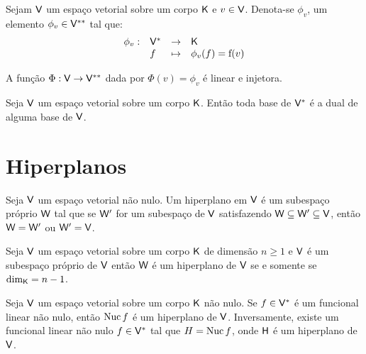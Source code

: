 \documentclass[10pt,a4paper]{book}
\begin{document}
\begin{remark}
	Sejam $\mathsf{ V }$ um espaço vetorial sobre um corpo $\mathsf{ K }$ e $v \in \mathsf{ V }$.	
	Denota-se $\phi_v$, um elemento $\phi_v \in \mathsf{ V } ^ {**}$ tal que: 
	\[
		\begin{array}{llll}
			\phi_v: & \mathsf{ V } ^ * &\rightarrow & \mathsf{ K }             \\
			        & f       &\mapsto     & \phi_v(f) = \mathrm{ f }(v)
		\end{array}
	\]
\end{remark}

\begin{lemma}
	A função $\Phi : \mathsf{ V } \rightarrow \mathsf{ V }^{**}$ dada por $\Phi(v) = \phi_v$ é linear e injetora.
\end{lemma}

\begin{corollary}
	Seja $\mathsf{ V }$ um espaço vetorial sobre um corpo $\mathsf{ K }$. Então toda base de $\mathsf{ V } ^ *$ é a dual de alguma base de $\mathsf{ V }$.
\end{corollary}




\section{Hiperplanos}

\begin{definition}[Hiperplano]
	Seja $\mathsf{ V }$ um espaço vetorial não nulo. Um hiperplano em $\mathsf{ V }$ é um subespaço próprio $\mathsf{ W }$ tal que se $\mathsf{ W }'$ for um subespaço de $\mathsf{ V }$ satisfazendo $\mathsf{ W } \subseteq \mathsf{ W }' \subseteq \mathsf{ V }$, então $\mathsf{ W } = \mathsf{ W }'$ ou $\mathsf{ W }' = \mathsf{ V }$.
\end{definition}

\begin{proposition}
	Seja $\mathsf{ V }$ um espaço vetorial sobre um corpo $\mathsf{ K }$ de dimensão $n \geq 1$ e $\mathsf{ V }$ é um subespaço próprio de $\mathsf{ V }$ então $\mathsf{ W }$ é um hiperplano de $\mathsf{ V }$ se e somente se $\dim_{\mathsf{ K }} = n - 1$.
\end{proposition}

\begin{theorem}
	Seja $\mathsf{ V }$ um espaço vetorial sobre um corpo $\mathsf{ K }$ não nulo. Se $f \in \mathsf{ V } ^ *$ é um funcional linear não nulo, então $\mathrm{ Nuc }\, f$ é um hiperplano de $\mathsf{ V }$. Inversamente, existe um funcional linear não nulo  $f \in \mathsf{ V } ^ *$ tal que $H = \mathrm{ Nuc }\, f$, onde $\mathsf{ H }$ é um hiperplano de $\mathsf{ V }$.
\end{theorem}
\end{document}
